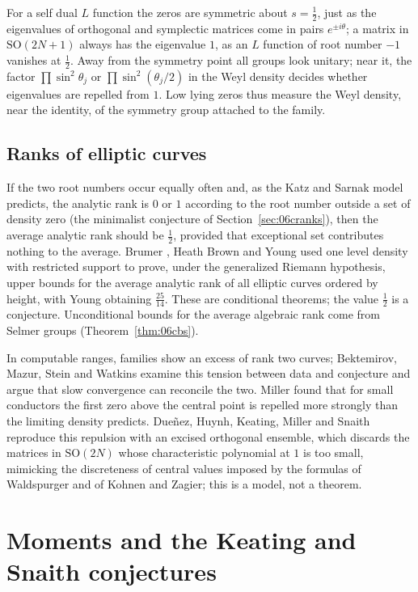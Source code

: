 For a self dual $L$ function the zeros are symmetric about $s=\frac12$, just as the eigenvalues of orthogonal and symplectic matrices come in pairs $e^{\pm i\theta}$; a matrix in $\mathrm{SO}(2N+1)$ always has the eigenvalue $1$, as an $L$ function of root number $-1$ vanishes at $\frac12$. Away from the symmetry point all groups look unitary; near it, the factor $\prod\sin^2\theta_j$ or $\prod\sin^2(\theta_j/2)$ in the Weyl density decides whether eigenvalues are repelled from $1$. Low lying zeros thus measure the Weyl density, near the identity, of the symmetry group attached to the family.

\subsection{Ranks of elliptic curves}

If the two root numbers occur equally often and, as the Katz and Sarnak model predicts, the analytic rank is $0$ or $1$ according to the root number outside a set of density zero (the minimalist conjecture of Section~\ref{sec:06cranks}), then the average analytic rank should be $\frac12$, provided that exceptional set contributes nothing to the average. Brumer \cite{brumer1992}, Heath Brown \cite{heathbrown2004} and Young \cite{young2006} used one level density with restricted support to prove, under the generalized Riemann hypothesis, upper bounds for the average analytic rank of all elliptic curves ordered by height, with Young obtaining $\frac{25}{14}$. These are conditional theorems; the value $\frac12$ is a conjecture. Unconditional bounds for the average algebraic rank come from Selmer groups (Theorem~\ref{thm:06cbs}).

In computable ranges, families show an excess of rank two curves; Bektemirov, Mazur, Stein and Watkins \cite{bmsw2007} examine this tension between data and conjecture and argue that slow convergence can reconcile the two. Miller \cite{miller2004,miller2006} found that for small conductors the first zero above the central point is repelled more strongly than the limiting density predicts. Due\~nez, Huynh, Keating, Miller and Snaith \cite{dhkms2012} reproduce this repulsion with an excised orthogonal ensemble, which discards the matrices in $\mathrm{SO}(2N)$ whose characteristic polynomial at $1$ is too small, mimicking the discreteness of central values imposed by the formulas of Waldspurger and of Kohnen and Zagier; this is a model, not a theorem.

\section{Moments and the Keating and Snaith conjectures}\label{sec:ch6ksnaith}


